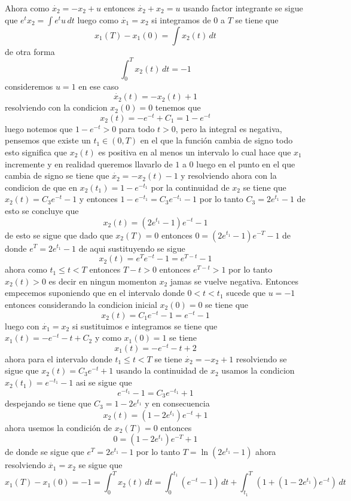 \documentclass{ejercicios}
\begin{document}
\begin{solution}
    Ahora como $\dot{x_2} = -x_2 + u$ entonces $\dot{x_2} + x_2 = u$ usando factor integrante se sigue que $e^tx_2 = \int e^tu\,dt$ luego como $\dot{x_1} = x_2$ si integramos de $0$ a $T$ se tiene que 
    \[x_1(T) - x_1(0) = \int{x_2(t)} \,dt\]
    de otra forma 
    \[\int_{0}^{T}x_2(t)\,dt = -1\] 
    consideremos $u=1$ en ese caso 
    \[\dot{x_2}(t) = -x_2(t) + 1\]
    resolviendo con la condicion $x_2(0) = 0$ tenemos que 
    \[x_2(t) = -e^{-t} + C_1 = 1 - e^{-t}\]
    luego notemos que $1 - e^{-t} > 0$ para todo $t>0$, pero la integral es negativa, pensemos que existe un $t_1\in(0,T)$ en el que la función cambia de signo
    todo esto significa que $x_2(t)$ es positiva en al menos un intervalo lo cual hace que $x_1$ incremente y en realidad queremos llavarlo de $1$ a $0$
    luego en el punto en el que cambia de signo se tiene que $\dot{x_2} = -x_2(t) - 1$ y resolviendo ahora con la condicion de que en $x_2(t_1)=1-e^{-t_1}$
    por la continuidad de $x_2$ se tiene que $x_2(t) = C_3e^{-t} - 1$ y entonces $1-e^{-t_1} = C_3e^{-t_1} - 1$ por lo tanto $C_3 = 2e^{t_1}-1$
    de esto se concluye que 
    \[x_2(t) = (2e^{t_1} - 1)e^{-t} - 1\]
    de esto se sigue que dado que $x_2(T) = 0$ entonces $0 = (2e^{t_1} - 1)e^{-T} - 1$ de donde $e^T = 2e^{t_1} - 1$ de aqui sustituyendo se sigue 
    \[x_2(t) = e^Te^{-t} - 1 = e^{T-t} - 1\]
    ahora como $t_1 \leq t < T$ entonces $T - t > 0$ entonces $e^{T-t} > 1$ por lo tanto $x_2(t) > 0$ es decir en ningun momenton $x_2$ jamas se vuelve negativa.
    Entonces empecemos suponiendo que en el intervalo donde $0 < t < t_1$ sucede que $u = -1$ entonces considerando la condicion inicial $x_2(0) = 0$ se tiene que 
    \[x_2(t) = C_1e^{-t} - 1 = e^{-t} - 1\]
    luego con $\dot{x_1}=x_2$ si sustituimos e integramos se tiene que $x_1(t) = -e^{-t} - t + C_2$ y como $x_1(0) = 1$ se tiene 
    \[x_1(t) = -e^{-t} - t + 2\]
    ahora para el intervalo donde $t_1 \leq t < T$ se tiene $\dot{x_2} = -x_2 + 1$ resolviendo se sigue que $x_2(t) = C_3e^{-t} + 1$
    usando la continuidad de $x_2$ usamos la condicion $x_2(t_1) = e^{-t_1} - 1$ asi se sigue que 
    \[e^{-t_1} - 1 = C_3e^{-t_1} + 1 \]
    despejando se tiene que $C_3 = 1 - 2e^{t_1}$ y en consecuencia
    \[x_2(t) = (1-2e^{t_1})e^{-t} + 1\]
    ahora usemos la condición de $x_2(T) = 0$ entonces 
    \[0 = (1 - 2e^{t_1})e^{-T} + 1 \]
    de donde se sigue que $e^T = 2e^{t_1} - 1$ por lo tanto $T = \ln(2e^{t_1} - 1)$
    ahora resolviendo $\dot{x_1} = x_2$ se sigue que 
    \[x_1(T) - x_1(0) = -1 = \int_{0}^{T}x_2(t)\,dt = \int_{0}^{t_1}(e^{-t} - 1)\,dt + \int_{t_1}^{T} (1 + (1 - 2e^{t_1})e^{-t})\,dt\]

\end{solution}
\end{document}
